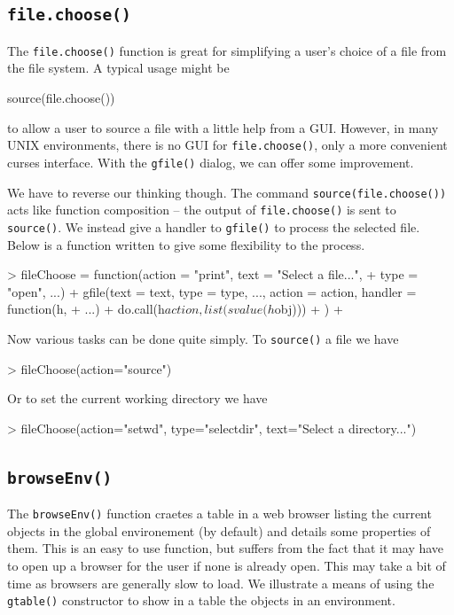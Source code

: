 \documentclass[12pt]{article}
\newcommand{\RCode}[1]{\texttt{#1}}
\newcommand{\RFunc}[1]{\texttt{#1()}}
\begin{document}
\subsection{\RFunc{file.choose}}
The \RFunc{file.choose} function is great for simplifying a user's
choice of a file from the file system. A typical usage might be
\begin{Soutput}
  source(file.choose())
\end{Soutput}
to allow a user to source a file with a little help from a
GUI. However, in many UNIX environments, there is no GUI for
\RFunc{file.choose}, only a more convenient curses interface. With the
\RFunc{gfile} dialog, we can offer some improvement.

We have to reverse our thinking though. The command
\RCode{source(file.choose())} acts like function composition -- the
output of \RFunc{file.choose} is sent to \RFunc{source}. We
instead give a handler to \RFunc{gfile} to process the selected
file. Below is a function written to give some flexibility to the
process.

\begin{Schunk}
\begin{Sinput}
> fileChoose = function(action = "print", text = "Select a file...", 
+     type = "open", ...) {
+     gfile(text = text, type = type, ..., action = action, handler = function(h, 
+         ...) {
+         do.call(h$action, list(svalue(h$obj)))
+     })
+ }
\end{Sinput}
\end{Schunk}

Now various tasks can be done quite simply. To \RFunc{source} a file
we have
\begin{Sinput}
> fileChoose(action="source")
\end{Sinput}

Or to set the   current working directory we have
\begin{Sinput}
>  fileChoose(action="setwd", type="selectdir", text="Select a directory...")
\end{Sinput}

\subsection{\RFunc{browseEnv}}
\label{sec:browseEnv}

The \RFunc{browseEnv} function craetes a table in a web browser
listing the current objects in the global environement (by default)
and details some properties of them. This is an easy to use function,
but suffers from the fact that it may have to open up a browser for
the user if none is already open. This may take a bit of time as
browsers are generally slow to load. We illustrate a means of using
the \RFunc{gtable} constructor to show in a table the objects in an
environment.
\end{document}
